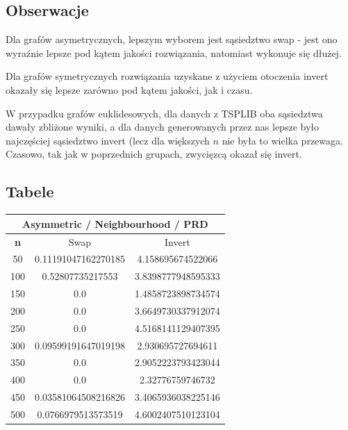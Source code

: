 \documentclass{article}
\begin{document}
\subsection{Obserwacje}

Dla grafów asymetrycznych, lepszym wyborem jest sąsiedztwo swap - jest ono wyraźnie lepsze pod kątem jakości rozwiązania, natomiast wykonuje się dłużej.

Dla grafów symetrycznych rozwiązania uzyskane z użyciem otoczenia invert okazały się lepsze zarówno pod kątem jakości, jak i czasu.

W przypadku grafów euklidesowych, dla danych z TSPLIB oba sąsiedztwa dawały zbliżone wyniki, a dla danych generowanych przez nas lepsze było najczęściej sąsiedztwo invert (lecz dla większych $n$ nie była to wielka przewaga. Czasowo, tak jak w poprzednich grupach, zwycięzcą okazał się invert.

\subsection{Tabele}

\begin{center}
\begin{tabular}{|c|c|c|}
\hline
\multicolumn{3}{|c|}{\textbf{Asymmetric / Neighbourhood / PRD}}\\
\hline
\textbf{n} & Swap & Invert\\
\hline
50 & 0.11191047162270185 & 4.158695674522066\\
\hline
100 & 0.52807735217553 & 3.8398777948595333\\
\hline
150 & 0.0 & 1.4858723898734574\\
\hline
200 & 0.0 & 3.6649730337912074\\
\hline
250 & 0.0 & 4.5168141129407395\\
\hline
300 & 0.09599191647019198 & 2.930695727694611\\
\hline
350 & 0.0 & 2.9052223793423044\\
\hline
400 & 0.0 & 2.32776759746732\\
\hline
450 & 0.03581064508216826 & 3.4065936038225146\\
\hline
500 & 0.0766979513573519 & 4.6002407510123104\\
\hline
\end{tabular}
\end{center}
\end{document}
